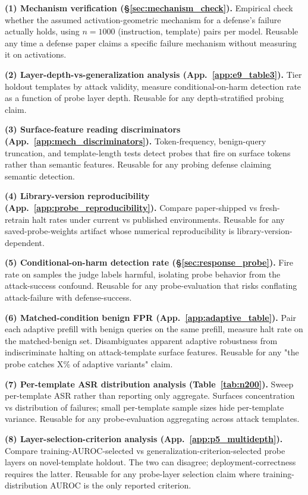 \documentclass{article}
\begin{document}
\textbf{(1) Mechanism verification (\S\ref{sec:mechanism_check}).} Empirical check whether the assumed activation-geometric mechanism for a defense's failure actually holds, using $n{=}1000$ (instruction, template) pairs per model. Reusable any time a defense paper claims a specific failure mechanism without measuring it on activations.

\textbf{(2) Layer-depth-vs-generalization analysis (App.~\ref{app:e9_table3}).} Tier holdout templates by attack validity, measure conditional-on-harm detection rate as a function of probe layer depth. Reusable for any depth-stratified probing claim.

\textbf{(3) Surface-feature reading discriminators (App.~\ref{app:mech_discriminators}).} Token-frequency, benign-query truncation, and template-length tests detect probes that fire on surface tokens rather than semantic features. Reusable for any probing defense claiming semantic detection.

\textbf{(4) Library-version reproducibility (App.~\ref{app:probe_reproducibility}).} Compare paper-shipped vs fresh-retrain halt rates under current vs published environments. Reusable for any saved-probe-weights artifact whose numerical reproducibility is library-version-dependent.

\textbf{(5) Conditional-on-harm detection rate (\S\ref{sec:response_probe}).} Fire rate on samples the judge labels harmful, isolating probe behavior from the attack-success confound. Reusable for any probe-evaluation that risks conflating attack-failure with defense-success.

\textbf{(6) Matched-condition benign FPR (App.~\ref{app:adaptive_table}).} Pair each adaptive prefill with benign queries on the same prefill, measure halt rate on the matched-benign set. Disambiguates apparent adaptive robustness from indiscriminate halting on attack-template surface features. Reusable for any "the probe catches X\% of adaptive variants" claim.

\textbf{(7) Per-template ASR distribution analysis (Table~\ref{tab:n200}).} Sweep per-template ASR rather than reporting only aggregate. Surfaces concentration vs distribution of failures; small per-template sample sizes hide per-template variance. Reusable for any probe-evaluation aggregating across attack templates.

\textbf{(8) Layer-selection-criterion analysis (App.~\ref{app:p5_multidepth}).} Compare training-AUROC-selected vs generalization-criterion-selected probe layers on novel-template holdout. The two can disagree; deployment-correctness requires the latter. Reusable for any probe-layer selection claim where training-distribution AUROC is the only reported criterion.
\end{document}
